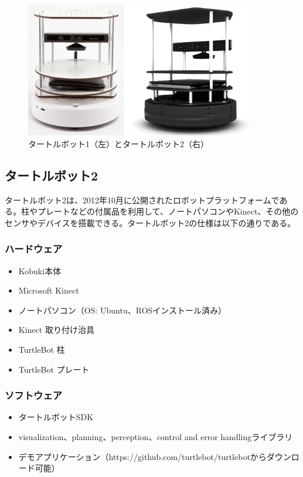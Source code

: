 \begin{figure}[htp]
  \centering
  \includegraphics[width=10cm]{pictures/chapter9/pic_09_01.png}
  \caption{タートルボット1（左）とタートルボット2（右）}
\end{figure}

\subsection{タートルボット2}

タートルボット2は、2012年10月に公開されたロボットプラットフォームである。柱やプレートなどの付属品を利用して、ノートパソコンやKinect、その他のセンサやデバイスを搭載できる。タートルボット2の仕様は以下の通りである。

\subsubsection{ハードウェア}
\begin{itemize}
\item Kobuki本体
\item Microsoft Kinect
\item ノートパソコン（OS: Ubuntu、ROSインストール済み）
\item Kinect 取り付け治具
\item TurtleBot 柱
\item TurtleBot プレート
\end{itemize}

\subsubsection{ソフトウェア}
\begin{itemize}
\item タートルボットSDK
\item visualization、planning、perception、control and error handlingライブラリ
\item デモアプリケーション（https://github.com/turtlebot/turtlebotからダウンロード可能）
\end{itemize}

